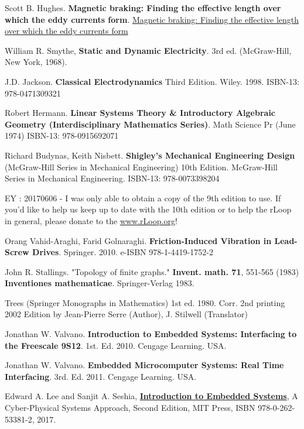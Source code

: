 \documentclass[10pt]{amsart}
\begin{document}
\begin{thebibliography}{9}


Scott B. Hughes.  \textbf{Magnetic braking: Finding the effective length over which the eddy currents form}.  
\href{https://drive.google.com/file/d/0Bwo3W0v5P04LX29XT2NFeVY0a1E/view}{Magnetic braking: Finding the effective length over which the eddy currents form}  


William R. Smythe, \textbf{Static and Dynamic Electricity}.  3rd ed. (McGraw-Hill, New York, 1968).  

J.D. Jackson.  \textbf{Classical Electrodynamics} Third Edition.  Wiley.  1998.   ISBN-13: 978-0471309321

Robert Hermann.  \textbf{Linear Systems Theory \& Introductory Algebraic Geometry (Interdisciplinary Mathematics Series)}.  Math Science Pr (June 1974)
ISBN-13: 978-0915692071

Richard Budynas, Keith Nisbett.  \textbf{Shigley's Mechanical Engineering Design} (McGraw-Hill Series in Mechanical Engineering) 10th Edition.  McGraw-Hill Series in Mechanical Engineering.  ISBN-13: 978-0073398204

EY : 20170606 -  I was only able to obtain a copy of the 9th edition to use.  If you'd like to help us keep up to date with the 10th edition or to help the rLoop in general, please donate to the \href{rLoop}{www.rLoop.org}!

Orang Vahid-Araghi, Farid Golnaraghi.  \textbf{Friction-Induced Vibration in Lead-Screw Drives}.  Springer.  2010.  e-ISBN 978-1-4419-1752-2



John R. Stallings.  "Topology of finite graphs."  \textbf{Invent. math. 71}, 551-565 (1983)  \textbf{Inventiones mathematicae}.  Springer-Verlag 1983.  


Trees (Springer Monographs in Mathematics) 1st ed. 1980. Corr. 2nd printing 2002 Edition
by Jean-Pierre Serre (Author), J. Stilwell (Translator) 

Jonathan W. Valvano.  \textbf{Introduction to Embedded Systems: Interfacing to the Freescale 9S12}.  1st. Ed. 2010.  Cengage Learning.  USA.  

Jonathan W. Valvano.  \textbf{Embedded Microcomputer Systems: Real Time Interfacing}.  3rd. Ed. 2011.  Cengage Learning.  USA.  

Edward A. Lee and Sanjit A. Seshia, \textbf{\href{http://leeseshia.org/index.html}{Introduction to Embedded Systems}}, A Cyber-Physical Systems Approach, Second Edition, MIT Press, ISBN 978-0-262-53381-2, 2017. 

\end{thebibliography}
\end{document}
